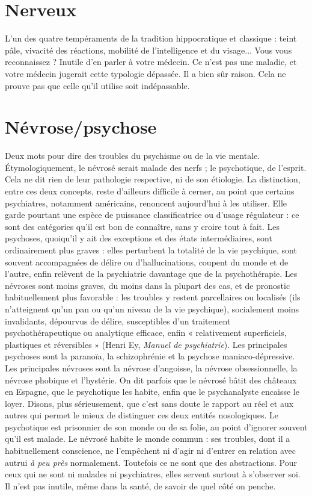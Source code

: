 \section{Nerveux}
L'un des quatre tempéraments de la tradition hippocratique et
classique : teint pâle, vivacité des réactions, mobilité de l’intelligence
et du visage... Vous vous reconnaissez ? Inutile d’en parler à votre
médecin. Ce n’est pas une maladie, et votre médecin jugerait cette typologie
dépassée. Il a bien sûr raison. Cela ne prouve pas que celle qu’il utilise soit indépassable.

\section{Névrose/psychose}
Deux mots pour dire des troubles du psychisme ou
de la vie mentale. Étymologiquement, le névrosé
serait malade des nerfs ; le psychotique, de l’esprit. Cela ne dit rien de leur
pathologie respective, ni de son étiologie. La distinction, entre ces deux
concepts, reste d’ailleurs difficile à cerner, au point que certains psychiatres,
notamment américains, renoncent aujourd’hui à les utiliser. Elle garde pourtant
une espèce de puissance classificatrice ou d’usage régulateur : ce sont des
catégories qu’il est bon de connaître, sans y croire tout à fait. Les psychoses,
quoiqu'il y ait des exceptions et des états intermédiaires, sont ordinairement
plus graves : elles perturbent la totalité de la vie psychique, sont souvent accompagnées
de délire ou d’hallucinations, coupent du monde et de l’autre, enfin
relèvent de la psychiatrie davantage que de la psychothérapie. Les névroses sont
moins graves, du moins dans la plupart des cas, et de pronostic habituellement
plus favorable : les troubles y restent parcellaires ou localisés (ils n’atteignent
qu'un pan ou qu’un niveau de la vie psychique), socialement moins invalidants,
dépourvus de délire, susceptibles d’un traitement psychothérapeutique
ou analytique efficace, enfin « relativement superficiels, plastiques et réversibles »
(Henri Ey, {\it Manuel de psychiatrie}). Les principales psychoses sont la
paranoïa, la schizophrénie et la psychose maniaco-dépressive. Les principales
névroses sont la névrose d’angoisse, la névrose obsessionnelle, la névrose phobique
et l’hystérie. On dit parfois que le névrosé bâtit des châteaux en Espagne,
que le psychotique les habite, enfin que le psychanalyste encaisse le loyer.
Disons, plus sérieusement, que c’est sans doute le rapport au réel et aux autres
qui permet le mieux de distinguer ces deux entités nosologiques. Le psychotique
est prisonnier de son monde ou de sa folie, au point d’ignorer souvent
qu’il est malade. Le névrosé habite le monde commun : ses troubles, dont il a
habituellement conscience, ne l’empêchent ni d’agir ni d’entrer en relation avec
autrui {\it à peu près} normalement. Toutefois ce ne sont que des abstractions. Pour
ceux qui ne sont ni malades ni psychiatres, elles servent surtout à s’observer soi.
Il n’est pas inutile, même dans la santé, de savoir de quel côté on penche.

